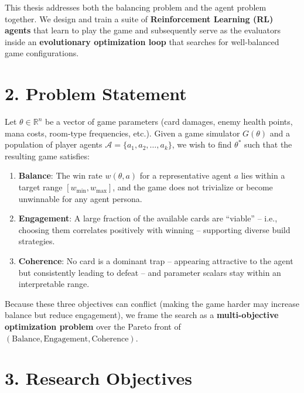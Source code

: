 This thesis addresses both the balancing problem and the agent problem together. We design and train a suite of \textbf{Reinforcement Learning (RL) agents} that learn to play the game and subsequently serve as the evaluators inside an \textbf{evolutionary optimization loop} that searches for well-balanced game configurations.

\section*{2. Problem Statement}

Let $\theta \in \mathbb{R}^n$ be a vector of game parameters (card damages, enemy health points, mana costs, room-type frequencies, etc.). Given a game simulator $G(\theta)$ and a population of player agents $\mathcal{A} = \{a_1, a_2, \ldots, a_k\}$, we wish to find $\theta^*$ such that the resulting game satisfies:
\begin{enumerate}
    \item \textbf{Balance}: The win rate $w(\theta, a)$ for a representative agent $a$ lies within a target range $[w_{\min}, w_{\max}]$, and the game does not trivialize or become unwinnable for any agent persona.
    \item \textbf{Engagement}: A large fraction of the available cards are ``viable'' -- i.e., choosing them correlates positively with winning -- supporting diverse build strategies.
    \item \textbf{Coherence}: No card is a dominant trap -- appearing attractive to the agent but consistently leading to defeat -- and parameter scalars stay within an interpretable range.
\end{enumerate}
Because these three objectives can conflict (making the game harder may increase balance but reduce engagement), we frame the search as a \textbf{multi-objective optimization problem} over the Pareto front of $(\text{Balance}, \text{Engagement}, \text{Coherence})$.

\section*{3. Research Objectives}

